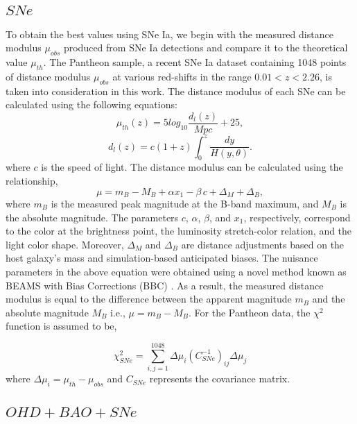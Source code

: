 \documentclass[prd,superscriptaddress,amsfonts,amssymb,amsmath,showpacs,twocolumn]{revtex4-2}
\begin{document}
\subsection{$SNe$}

To obtain the best values using SNe Ia, we begin with the measured distance
modulus $\mu_{obs}$ produced from SNe Ia detections and compare it to the
theoretical value $\mu_{th}$. The Pantheon sample, a recent SNe Ia dataset
containing 1048 points of distance modulus $\mu_{obs}$ at various red-shifts
in the range $0.01<z<2.26$, is taken into consideration in this work. The
distance modulus of each SNe can be calculated using the following
equations: 
\begin{equation}
\mu_{th}(z)=5 log_{10} \frac{d_{l}(z)}{Mpc}+25,
\end{equation}
\begin{equation}
d_{l}(z)=c(1+z) \int_{0}^{z} \frac{dy}{H(y,\theta)}.
\end{equation}
where $c$ is the speed of light. The distance modulus can be calculated
using the relationship, 
\begin{equation}
\mu= m_{B}-M_{B}+\alpha x_{1} - \beta\, c + \Delta_{M} + \Delta_{B},
\end{equation}
where $m_{B}$ is the measured peak magnitude at the B-band maximum, and $%
M_{B}$ is the absolute magnitude. The parameters $c$, $\alpha$, $\beta$, and 
$x_{1}$, respectively, correspond to the color at the brightness point, the
luminosity stretch-color relation, and the light color shape. Moreover, $%
\Delta_{M}$ and $\Delta_{B}$ are distance adjustments based on the host
galaxy's mass and simulation-based anticipated biases. The nuisance
parameters in the above equation were obtained using a novel method known as
BEAMS with Bias Corrections (BBC) \cite{Kessler/2017}. As a result, the
measured distance modulus is equal to the difference between the apparent
magnitude $m_{B}$ and the absolute magnitude $M_{B}$ i.e., $\mu = m_{B}-M_{B}
$. For the Pantheon data, the $\chi^{2}$ function is assumed to be,

\begin{equation}
\chi^{2}_{SNe} =\sum_{i,j=1} ^{1048} \Delta \mu_{i} \left(
C_{SNe}^{-1}\right)_{ij} \Delta \mu_{j}
\end{equation}
where $\Delta \mu_{i}= \mu_{th}-\mu_{obs}$ and $C_{SNe}$ represents the
covariance matrix.

\subsection{$OHD+BAO+SNe$}
\end{document}
